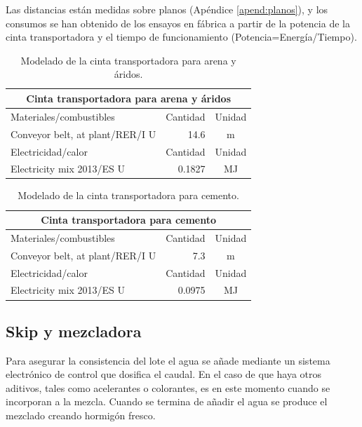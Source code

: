 Las distancias están medidas sobre planos (Apéndice \ref{apend:planos}), y los consumos se han obtenido de los ensayos en fábrica a partir de la potencia de la cinta transportadora y el tiempo de funcionamiento (Potencia=Energía/Tiempo).

\begin{table}[!htb]
\centering
\begin{tabular}{p{8cm}rc}
\toprule
\multicolumn{3}{c}{Cinta transportadora para arena y áridos}\\
\midrule
Materiales/combustibles & Cantidad & Unidad\\
\midrule
Conveyor belt, at plant/RER/I U & 14.6 & \si{m}\\
\midrule
Electricidad/calor & Cantidad & Unidad\\
\midrule
Electricity mix 2013/ES U & 0.1827 & \si{MJ}\\
\bottomrule
\end{tabular}
\caption{Modelado de la cinta transportadora para arena y áridos.}
\label{modeladodecintaarena}
\end{table}

\begin{table}[!htb]
\centering
\begin{tabular}{p{8cm}rc}
\toprule
\multicolumn{3}{c}{Cinta transportadora para cemento}\\
\midrule
Materiales/combustibles & Cantidad & Unidad\\
\midrule
Conveyor belt, at plant/RER/I U & 7.3 & \si{m}\\
\midrule
Electricidad/calor & Cantidad & Unidad\\
\midrule
Electricity mix 2013/ES U & 0.0975 & \si{MJ}\\
\bottomrule
\end{tabular}
\caption{Modelado de la cinta transportadora para cemento.}
\label{modeladodecintacemento}
\end{table}

\subsection{Skip y mezcladora}

Para asegurar la consistencia del lote el agua se añade mediante un sistema electrónico de control que dosifica el caudal. En el caso de que haya otros aditivos, tales como acelerantes o colorantes, es en este momento cuando se incorporan a la mezcla. Cuando se termina de añadir el agua se produce el mezclado creando hormigón fresco.

